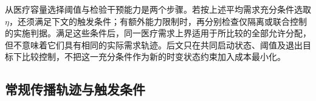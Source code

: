 从医疗容量选择阈值与检验干预能力是两个步骤。若按上述平均需求充分条件选取 $\eta$，还须满足下文的触发条件；有额外能力限制时，再分别检查仅隔离或联合控制的实施判据。满足这些条件后，同一医疗需求上界适用于所比较的全部允许分配，但不意味着它们具有相同的实际需求轨迹。后文只在共同启动状态、阈值及退出目标下比较控制，不把这一充分条件作为新的时变状态约束加入成本最小化。

\subsection{常规传播轨迹与触发条件}
